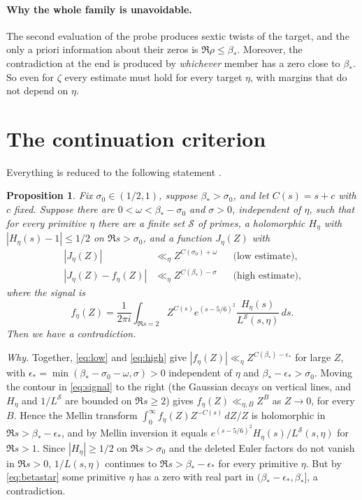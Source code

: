 \documentclass[11pt]{article}
\newtheorem{proposition}{Proposition}
\begin{document}
\paragraph{Why the whole family is unavoidable.} The second evaluation of
the probe produces sextic twists of the target, and the only a priori
information about their zeros is $\Re\rho\le\beta_*$. Moreover, the
contradiction at the end is produced by \emph{whichever} member has a zero
close to $\beta_*$. So even for $\zeta$ every estimate must hold for every
target $\eta$, with margins that do not depend on $\eta$.

\section{The continuation criterion}\label{sec:criterion}

Everything is reduced to the following statement \cite[Prop.\ lem:continuation-criterion]{OAI78}.

\begin{proposition}\label{prop:criterion}
Fix $\sigma_0\in(1/2,1)$, suppose $\beta_*>\sigma_0$, and let
$C(s)=s+c$ with $c$ fixed. Suppose there are $0<\omega<\beta_*-\sigma_0$ and
$\sigma>0$, independent of $\eta$, such that for every primitive $\eta$
there are a finite set $\mathcal S$ of primes, a holomorphic
$H_\eta$ with $|H_\eta(s)-1|\le1/2$ on $\Re s>\sigma_0$, and a function
$J_\eta(Z)$ with
\begin{align}
 |J_\eta(Z)|&\ll_\eta Z^{C(\sigma_0)+\omega}
   &&\text{(low estimate)},\label{eq:low}\\
 |J_\eta(Z)-f_\eta(Z)|&\ll_\eta Z^{C(\beta_*)-\sigma}
   &&\text{(high estimate)},\label{eq:high}
\end{align}
where the \emph{signal} is
\begin{equation}\label{eq:signal}
 f_\eta(Z)=\frac1{2\pi i}\int_{\Re s=2}Z^{C(s)}e^{(s-5/6)^2}
 \frac{H_\eta(s)}{L^{\mathcal S}(s,\eta)}\,ds .
\end{equation}
Then we have a contradiction.
\end{proposition}

\emph{Why.} Together, \eqref{eq:low} and \eqref{eq:high} give
$|f_\eta(Z)|\ll_\eta Z^{C(\beta_*)-\epsilon_*}$ for large $Z$, with
$\epsilon_*=\min(\beta_*-\sigma_0-\omega,\sigma)>0$ independent of $\eta$ and
$\beta_*-\epsilon_*>\sigma_0$. Moving the contour in \eqref{eq:signal} to the right
(the Gaussian decays on vertical lines, and $H_\eta$ and $1/L^{\mathcal S}$ are bounded
on $\Re s\ge2$) gives $f_\eta(Z)\ll_{\eta,B}Z^{B}$ as $Z\to0$, for every $B$.
Hence the Mellin transform $\int_0^\infty f_\eta(Z)Z^{-C(s)}\,dZ/Z$ is holomorphic
in $\Re s>\beta_*-\epsilon_*$, and by Mellin inversion it equals
$e^{(s-5/6)^2}H_\eta(s)/L^{\mathcal S}(s,\eta)$ for $\Re s>1$. Since $|H_\eta|\ge1/2$
on $\Re s>\sigma_0$ and the deleted Euler factors do not vanish in $\Re s>0$,
$1/L(s,\eta)$ continues to $\Re s>\beta_*-\epsilon_*$ for every primitive $\eta$.
But by \eqref{eq:betastar} some primitive $\eta$ has a zero with real part in
$(\beta_*-\epsilon_*,\beta_*]$, a contradiction.
\end{document}
